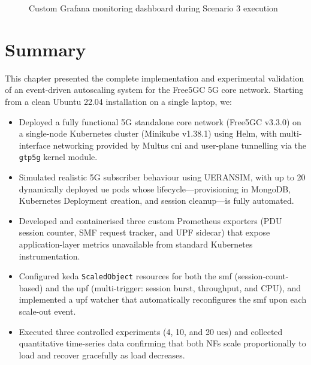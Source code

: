 \begin{figure}[H]
  \centering
  \caption{Custom Grafana monitoring dashboard during Scenario 3 execution}
  \label{fig:grafana_dashboard}
\end{figure}

\section{Summary}
\label{sec:chap4_summary}

This chapter presented the complete implementation and experimental validation of an event-driven autoscaling system for the Free5GC 5G core network. Starting from a clean Ubuntu 22.04 installation on a single laptop, we:

\begin{itemize}
  \item Deployed a fully functional \gls{5G} standalone core network (Free5GC v3.3.0) on a single-node Kubernetes cluster (Minikube v1.38.1) using Helm, with multi-interface networking provided by Multus \gls{cni} and user-plane tunnelling via the \texttt{gtp5g} kernel module.
  \item Simulated realistic \gls{5G} subscriber behaviour using UERANSIM, with up to 20 dynamically deployed \gls{ue} pods whose lifecycle—provisioning in MongoDB, Kubernetes Deployment creation, and session cleanup—is fully automated.
  \item Developed and containerised three custom Prometheus exporters (PDU session counter, SMF request tracker, and UPF sidecar) that expose application-layer metrics unavailable from standard Kubernetes instrumentation.
  \item Configured \gls{keda} \texttt{ScaledObject} resources for both the \gls{smf} (session-count-based) and the \gls{upf} (multi-trigger: session burst, throughput, and CPU), and implemented a \gls{upf} watcher that automatically reconfigures the \gls{smf} upon each scale-out event.
  \item Executed three controlled experiments (4, 10, and 20 \glspl{ue}) and collected quantitative time-series data confirming that both NFs scale proportionally to load and recover gracefully as load decreases.
\end{itemize}

